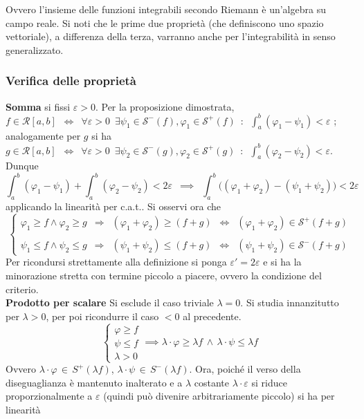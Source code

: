 \documentclass[10pt, oneside]{book}
\theoremstyle{plain}
\begin{document}
Ovvero l'insieme delle funzioni integrabili secondo Riemann è un'algebra su campo reale. Si noti che le prime due proprietà (che definiscono uno spazio vettoriale), a differenza della terza, varranno anche per l'integrabilità in senso generalizzato.
\subsubsection*{Verifica delle proprietà}
\textbf{Somma} si fissi $\varepsilon > 0$. Per la proposizione dimostrata, $f \in \mathcal{R}[a,b] \enspace \Leftrightarrow \enspace \forall \varepsilon > 0 \enspace \exists \psi_1 \in \mathcal{S}^-(f) , \varphi_1 \in \mathcal{S}^+(f) \enspace : \enspace \int_a^b (\varphi_1 - \psi_1) < \varepsilon$ ; analogamente per $g$ si ha $g \in \mathcal{R}[a,b] \enspace \Leftrightarrow \enspace \forall \varepsilon > 0 \enspace \exists \psi_2 \in \mathcal{S}^-(g) , \varphi_2 \in \mathcal{S}^+(g) \enspace : \enspace \int_a^b (\varphi_2 - \psi_2) < \varepsilon$. Dunque 
\[\int_a^b (\varphi_1 - \psi_1) + \int_a^b (\varphi_2 - \psi_2) < 2\varepsilon \enspace \implies \enspace \int_a^b \big((\varphi_1 + \varphi_2) - (\psi_1 + \psi_2)\big) < 2\varepsilon\]
applicando la linearità per c.a.t.. Si osservi ora che 
\[\begin{cases}
    \varphi_1 \geq f \land \varphi_2 \geq g \enspace \Rightarrow \enspace (\varphi_1 + \varphi_2) \geq (f+g) \enspace \Leftrightarrow \enspace (\varphi_1 + \varphi_2) \in \mathcal{S}^+(f+g)\\
\\
    \psi_1 \leq f \land \psi_2 \leq g \enspace \Rightarrow \enspace (\psi_1 + \psi_2) \leq (f+g) \enspace \Leftrightarrow \enspace (\psi_1 + \psi_2) \in \mathcal{S}^-(f+g)
\end{cases}\]
Per ricondursi strettamente alla definizione si ponga $\varepsilon' = 2\varepsilon$ e si ha la minorazione stretta con termine piccolo a piacere, ovvero la condizione del criterio.
\\\textbf{Prodotto per scalare} Si esclude il caso triviale $\lambda = 0$. Si studia innanzitutto per $\lambda > 0$, per poi ricondurre il caso $< 0$ al precedente.
\[\begin{cases}
\displaystyle \varphi \geq f\\
\displaystyle \psi \leq f\\
\displaystyle \lambda > 0
\end{cases}
\implies \lambda \cdot \varphi \geq \lambda f \, \land \, \lambda \cdot \psi \leq \lambda f\]
Ovvero $\lambda \cdot \varphi \, \in \, S^+(\lambda f)$, $\lambda \cdot \psi \, \in \, S^-(\lambda f)$. Ora, poiché il verso della diseguaglianza è mantenuto inalterato e a $\lambda$ costante $ \lambda \cdot \varepsilon$ si riduce proporzionalmente a $\varepsilon$ (quindi può divenire arbitrariamente piccolo) si ha per linearità
\end{document}
